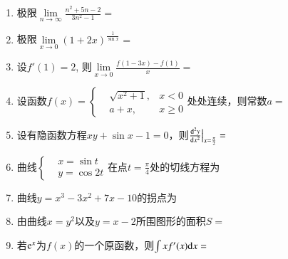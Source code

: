 \documentclass[twocolumn,landscape,UTF8]{ctexart}
\begin{document}
\newcommand{\school}{中国计量大学}
\def\kecheng{高等数学A1}   %
\def\xueniana{19}         %
\def\xuenianb{20}         %
\def\xueqi{1}             %
\def\leixing{A}           %
\def\kaikexueyuan{理学院}  %
\def\class{重修班}         %
\def\teacher{何足道}       %
\def\nian{2020}           %
\def\yue{01}              %
\def\ri{04}               %
\def\shi{9}               %
\def\ruchang{证件、文具等考试必备物品}  %


\begin{enumerate}
	\item 极限$\lim\limits_{n\to\infty}\frac{n^2+5n-2}{3n^2-1}=$
	\item 极限$\lim\limits_{x\to0}{(1+2x)^{\frac{1}{\sin x}}}=$
	\item 设$f'(1)=2$, 则$\lim\limits_{x\to0}\frac{f(1-3x)-f(1)}{x}=$
	\item 设函数$f(x)=\left\{\begin{aligned}&\sqrt{x^2+1},&x<0\\ &a+x,&x\geqslant 0\end{aligned}\right.$处处连续，则常数$a=$
	\item 设有隐函数方程$xy + \sin x - 1 = 0$，则$\frac{\mathrm{d}^2y}{\mathrm{d} x^2}\big|_{x=\frac{\pi}{2}}=$
	\item 曲线$\left\{\begin{aligned}&x=\sin t\\ &y=\cos 2t\end{aligned}\right.$在点$t=\frac{\pi}{4}$处的切线方程为
	\item 曲线$y=x^3-3x^2+7x-10$的拐点为
	\item 由曲线$x=y^2$以及$y=x-2$所围图形的面积$S=$ 
	\item 若$\mathrm{e}^x$为$f(x)$的一个原函数，则$\int xf'(x)\mathrm{d} x=$
\end{enumerate}
\end{document}
